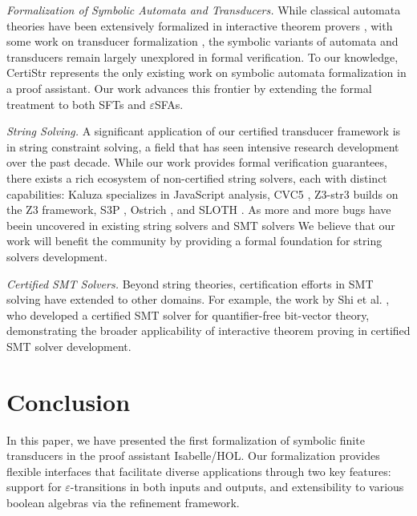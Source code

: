 \documentclass[a4paper,UKenglish,cleveref, autoref, thm-restate]{lipics-v2021}
\begin{document}
\emph{Formalization of Symbolic Automata and Transducers.} While classical automata theories have been extensively formalized in interactive theorem provers \cite{Tuerk-NFA, Lammich2014TheCA, Peter14, cpp/DoczkalKS13}, with some work on transducer formalization \cite{afp/LochmannFSTS21}, the symbolic variants of automata and transducers remain largely unexplored in formal verification. To our knowledge, CertiStr \cite{cpp/KanLRS22} represents the only existing work on symbolic automata formalization in a proof assistant. Our work advances this frontier by extending the formal treatment to both SFTs and $\varepsilon$SFAs.


\emph{String Solving.} A significant application of our certified transducer framework is in string constraint solving, a field that has seen intensive research development over the past decade. While our work provides formal verification guarantees, there exists a rich ecosystem of non-certified string solvers, each with distinct capabilities: Kaluza \cite{Berkeley-JavaScript} specializes in JavaScript analysis, CVC5 \cite{cvc5}, Z3-str3 \cite{Z3-str3} builds on the Z3 framework, S3P \cite{DBLP:conf/ccs/TrinhCJ14}, Ostrich \cite{pacmpl/ChenFHHHKLRW22}, and SLOTH \cite{HJLRV18}.
As more and more bugs have beein uncovered in existing string solvers \cite{DBLP:conf/cav/BlotskyMBZKG18} and SMT solvers \cite{Mansur20} 
We believe that our work will benefit the community by providing a formal foundation for string solvers development.



\emph{Certified SMT Solvers.} Beyond string theories, certification efforts in SMT solving have extended to other domains. For example, the work by Shi et al. \cite{DBLP:conf/cav/ShiFLTWY20}, who developed a certified SMT solver for quantifier-free bit-vector theory, demonstrating the broader applicability of interactive theorem proving in certified SMT solver development.


\section{Conclusion}
\label{sec:conclusion}

In this paper, we have presented the first formalization of symbolic finite transducers in the proof assistant Isabelle/HOL. Our formalization provides flexible interfaces that facilitate diverse applications through two key features: support for $\varepsilon$-transitions in both inputs and outputs, and extensibility to various boolean algebras via the refinement framework.
\end{document}
